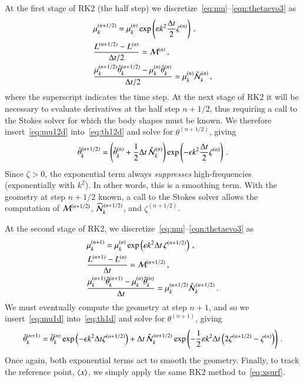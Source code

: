 \documentclass[preprint, 10pt]{elsarticle}
\begin{document}
At the first stage of RK2 (the half step) we discretize~\eqref{eq:mu}--\eqref{eqn:thetaevo3} as
\begin{align}
\label{eq:mu12d}
& \mu_k^{(n+1/2)} = \mu_k^{(n)} \exp \left( \varepsilon k^2 \frac{\Delta t}{2}
\zeta^{(n)} \right) \, , \\
\label{eq:L12d}
& \frac{L^{(n+1/2)} - L^{(n)}}{\Delta t/2} = \mathcal{M}^{(n)} \, , \\
\label{eq:th12d}
& \frac{ \mu_k^{(n+1/2)} \hat{\theta}_k^{(n+1/2)} - \mu_k^{(n)} \hat{\theta}_k^{(n)}}{\Delta t/2} 
= \mu_k^{(n)} \hat{\mathcal{N}}_k^{(n)} \, ,
\end{align}
where the superscript indicates the time step. At the next stage of RK2
it will be necessary to evaluate derivatives at the half step $n+1/2$, thus requiring a call to the Stokes solver for which the body shapes must be known. We therefore insert~\eqref{eq:mu12d} into~\eqref{eq:th12d} and solve for $\theta^{(n+1/2)}$, giving
\begin{align}
\label{eq:th12}
\hat{\theta}_k^{(n+1/2)} = \left( \hat{\theta}_k^{(n)} + \frac{1}{2} \Delta t \, \hat{\mathcal{N}}_k^{(n)} \right)
\exp \left( -\epsilon k^2 \frac{\Delta t}{2} \zeta^{(n)}\right) \, .
\end{align}
Since $\zeta >0$, the exponential term always {\em suppresses} high-frequencies (exponentially with $k^2$). In other words, this is a smoothing term. With the geometry at step $n+1/2$ known, a call to the Stokes solver allows the computation of $\mathcal{M}^{(n+1/2)}$, $\widehat{\NLterm}_k^{(n+1/2)}$, and $\zeta^{(n+1/2)}$.

At the second stage of RK2, we discretize~\eqref{eq:mu}--\eqref{eqn:thetaevo3} as 
\begin{align}
\label{eq:mu1d}
& \mu_k^{(n+1)} = \mu_k^{(n)} \exp \left( \varepsilon k^2 {\Delta t} \,
\zeta^{(n+1/2)} \right) \, , \\
\label{eq:L1d}
& \frac{L^{(n+1)} - L^{(n)}}{\Delta t} = \mathcal{M}^{(n+1/2)} \, , \\
\label{eq:th1d}
& \frac{ \mu_k^{(n+1)} \hat{\theta}_k^{(n+1)} - \mu_k^{(n)} \hat{\theta}_k^{(n)}}{\Delta t} =
\mu_k^{(n+1/2)} \hat{\mathcal{N}}_k^{(n+1/2)} \, .
\end{align}
We must eventually compute the geometry at step $n+1$, and so we insert~\eqref{eq:mu1d} into~\eqref{eq:th1d} and solve for $\theta^{(n+1)}$, giving
\begin{align}
\hat{\theta}_k^{(n+1)} =  \hat{\theta}_k^{(n)} \exp \left( - \epsilon k^2 \Delta t
\zeta^{(n+1/2)} \right) + \Delta t \, \hat{\mathcal{N}}_k^{(n+1/2)} \exp \left(
- \frac{1}{2} \varepsilon k^2 \Delta t \left( 2 \zeta^{(n+1/2)} - \zeta^{(n)}
\right) \right) \, .
\end{align}
Once again, both exponential terms act to smooth the geometry. Finally, to track the reference point, $\left< x \right>$, we simply apply the same RK2 method to~\eqref{eq:xsurf}.
\end{document}
